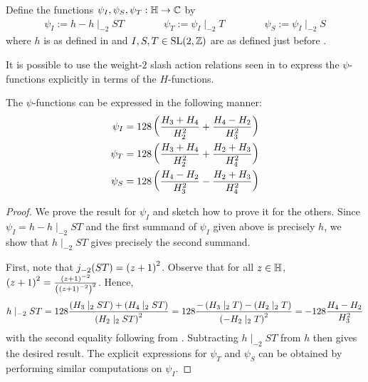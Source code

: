 \begin{boxdefinition}\label{Ch4:Def:psis_in_terms_of_h}
    Define the functions $\psi_I, \psi_S, \psi_T : \mathbb{H} \to \mathbb{C}$ by
    \begin{align*}
        \psi_I := h - h\mid_{-2} ST
        \qquad\qquad
        \psi_T := \psi_I \mid_{-2} T
        \qquad\qquad
        \psi_S := \psi_I \mid_{-2} S
    \end{align*}
    where $h$ is as defined in  and $I, S, T \in \operatorname{SL}\!\left( 2, \mathbb{Z} \right)$ are as defined just before .
\end{boxdefinition}

It is possible to use the weight-$2$ slash action relations seen in  to express the $\psi$-functions explicitly in terms of the $H$-functions.

\begin{boxlemma}\label{Ch4:Lemma:psi_explicitly}
    The $\psi$-functions can be expressed in the following manner:
    \begin{align*}
        \psi_I &= 128 \left( \frac{H_3 + H_4}{H_2^2} + \frac{H_4 - H_2}{H_3^2} \right) \\
        \psi_T &= 128 \left( \frac{H_3 + H_4}{H_2^2} + \frac{H_2 + H_3}{H_4^2} \right) \\
        \psi_S &= 128 \left( \frac{H_4 - H_2}{H_3^2} - \frac{H_2 + H_3}{H_4^2} \right)
    \end{align*}
\end{boxlemma}
\begin{proof}
    We prove the result for $\psi_I$ and sketch how to prove it for the others. Since $\psi_I = h - h \mid_{-2} ST$ and the first summand of $\psi_I$ given above is precisely $h$, we show that $h \mid_{-2} ST$ gives precisely the second summand.

    First, note that $j_{-2}\!\left( ST \right) = \left( z + 1 \right)^2$. Observe that for all $z \in \mathbb{H}$, $\left( z + 1 \right)^2 = \frac{\left( z + 1 \right)^{-2}}{\left( \left( z + 1 \right)^{-2} \right)^2}$. Hence,
    \begin{align*}
        h \mid_{-2} ST
        = 128 \frac{\left( H_3 \mid_2 ST \right) + \left( H_4 \mid_2 ST \right)}{\left( H_2 \mid_2 ST \right)^2}
        = 128 \frac{-\left( H_3 \mid_2 T \right) - \left( H_2 \mid_2 T \right)}{\left( -H_2 \mid_2 T \right)^2}
        = -128 \frac{H_4 - H_2}{H_3^2}
    \end{align*}
    with the second equality following from . Subtracting $h \mid_{-2} ST$ from $h$ then gives the desired result. The explicit expressions for $\psi_T$ and $\psi_S$ can be obtained by performing similar computations on $\psi_I$.
\end{proof}

